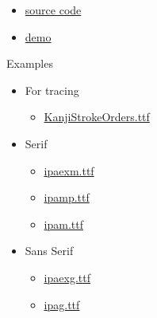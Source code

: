 \documentclass[letterpaper]{article}
\begin{document}
	\vspace*{1cm}
 
	\begin{itemize}
		
			\item[] {\Large 
			 \href{https://github.com/gwmatthews/TheFourVows}{source code}}
			 \item[] {\Large 
			 	\href{https://gwmatthews.github.io/the-four-vows.pdf}{demo}}
		
	\end{itemize}
	
	
	\vfill\eject\pagebreak
	
	\vspace*{2cm}
	
	{\LARGE Examples}
	
	\vspace*{1cm}
	
	
	
	\begin{itemize}
		\item[] {\LARGE For tracing}
		\begin{itemize}
			\item[] \href{https://gwmatthews.github.io/examples/the-four-vows-stroke-order.pdf}{KanjiStrokeOrders.ttf}
		\end{itemize}
	\end{itemize}
	
	\vspace*{1cm}
	
	\begin{itemize}
		\item[] {\LARGE Serif}
		\begin{itemize}
			\item[] \href{https://gwmatthews.github.io/examples/the-four-vows-ipaexm.pdf}{ipaexm.ttf}
			\item[] \href{https://gwmatthews.github.io/examples/the-four-vows-ipamp.pdf}{ipamp.ttf}
			\item[] 
			\href{https://gwmatthews.github.io/examples/the-four-vows-ipam.pdf}{ipam.ttf}
		\end{itemize}
	\end{itemize}
	
	\vspace*{1cm}
	
	\begin{itemize}
		\item[] {\LARGE Sans Serif}
		\begin{itemize}
			\item[] \href{https://gwmatthews.github.io/examples/the-four-vows-ipaexg.pdf}{ipaexg.ttf}
			\item[] 
			\href{https://gwmatthews.github.io/examples/the-four-vows-ipag.pdf}{ipag.ttf}
		\end{itemize}
	\end{itemize}
\end{document}
